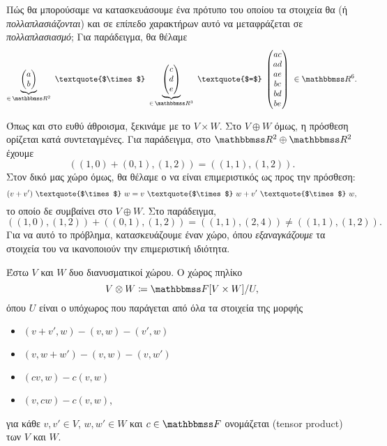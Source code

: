 \documentclass[12pt,a4paper,reqno]{amsart}
\newcommand{\defn}[1]{{\color{mylightblue}{#1}}}
\begin{document}
Πώς θα μπορούσαμε να κατασκευάσουμε ένα πρότυπο του οποίου τα στοιχεία θα  (ή \emph{πολλαπλασιάζονται}) και σε επίπεδο χαρακτήρων αυτό να μεταφράζεται σε \emph{πολλαπλασιασμό}; Για παράδειγμα, θα θέλαμε 
\[
\underbrace{\begin{pmatrix}
    a \\ 
    b
\end{pmatrix}}_{\in \, \RR^2}
\ \text{\textquote{$\times$}} \
\underbrace{\begin{pmatrix}
    c \\ 
    d \\ 
    e
\end{pmatrix}}_{\in \, \RR^3}
\ \text{\textquote{$=$}} \
\begin{pmatrix}
    ac \\ 
    ad \\ 
    ae \\ 
    bc \\ 
    bd \\
    be
\end{pmatrix} \ \in \RR^6.
\]

Όπως και στο ευθύ άθροισμα, ξεκινάμε με το $V\times{W}$. Στο $V \oplus W$ όμως, η πρόσθεση ορίζεται κατά συντεταγμένες. Για παράδειγμα, στο $\RR^2 \oplus \RR^2$ έχουμε 
\[
((1,0) + (0,1), (1,2)) = ((1,1), (1,2)).
\]
Στον δικό μας χώρο όμως, θα θέλαμε ο  να είναι επιμεριστικός ως προς την πρόσθεση:
\[
(v + v') \ \text{\textquote{$\times$}} \ w = 
v \ \text{\textquote{$\times$}} \ w + v' \ \text{\textquote{$\times$}} \ w,
\]
το οποίο δε συμβαίνει στο $V\oplus W$. Στο παράδειγμα, 
\[
((1,0), (1,2)) + ((0,1),(1,2)) = ((1,1), (2,4)) \neq ((1,1), (1,2)).
\] 
Για να \textquote{λύσουμε} αυτό το πρόβλημα, κατασκευάζουμε έναν χώρο, όπου \emph{εξαναγκάζουμε} τα στοιχεία του να ικανοποιούν την επιμεριστική ιδιότητα.

\begin{definition}
    \label{def:tensor_product}
    Έστω $V$ και $W$ δυο διανυσματικοί χώρου. Ο χώρος πηλίκο
    \[
    V \otimes W \coloneqq \FF[V \times W] / U,
    \]
    όπου $U$ είναι ο υπόχωρος που παράγεται από όλα τα στοιχεία της μορφής 
    \begin{itemize}
        \item $(v + v', w) - (v,w) - (v',w)$
        \item $(v, w+w') - (v,w) - (v,w')$
        \item $(cv, w) - c(v,w)$
        \item $(v, cw) - c(v,w)$,
    \end{itemize}
    για κάθε $v, v' \in V$, $w, w' \in W$ και $c \in \FF$ ονομάζεται \defn{τανυστικό γινόμενο} (tensor product) των $V$ και $W$.
\end{definition}
\end{document}
